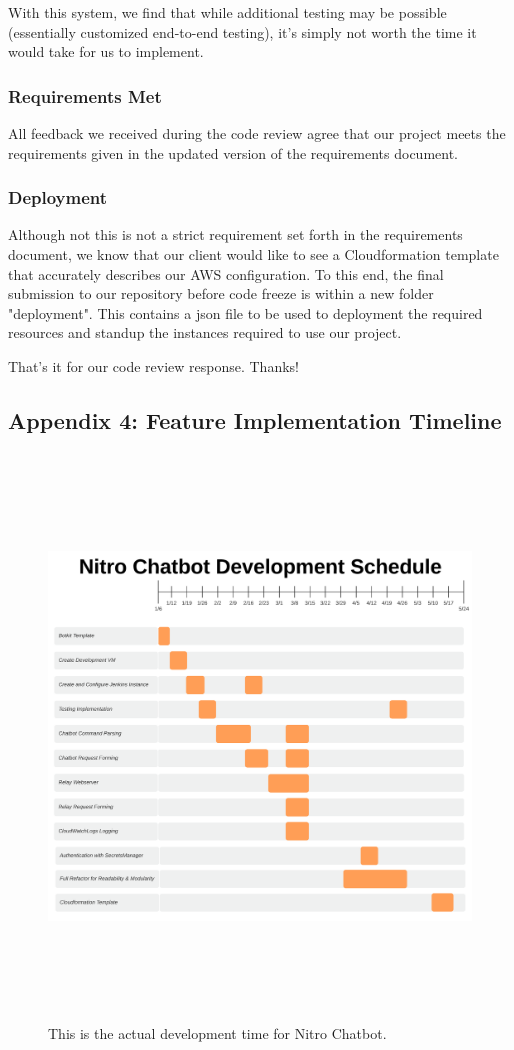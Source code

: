 \documentclass[onecolumn, draftclsnofoot,10pt, compsoc]{IEEEtran}
\begin{document}
With this system, we find that while additional testing may be possible (essentially customized end-to-end testing), it's simply not worth the time it would take for us to implement.

\subsubsection{Requirements Met}
All feedback we received during the code review agree that our project meets the requirements given in the updated version of the requirements document.

\subsubsection{Deployment}
Although not this is not a strict requirement set forth in the requirements document, we know that our client would like to see a Cloudformation template that accurately describes our AWS configuration.
To this end, the final submission to our repository before code freeze is within a new folder "deployment".
This contains a json file to be used to deployment the required resources and standup the instances required to use our project.

That's it for our code review response. Thanks!

\clearpage
\subsection{Appendix 4: Feature Implementation Timeline}
\begin{figure}[ht]
    \centering
    \includegraphics[height=15cm]{gantt-v2.png}
    \caption[Feature implementation timeline]{This is the actual development time for Nitro Chatbot.}
    \label{fig:Feature implementation Timeline}
\end{figure}

\clearpage


\end{document}
